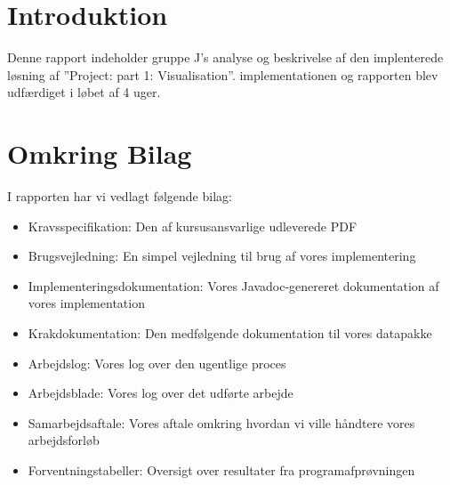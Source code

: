 \section{Introduktion}
Denne rapport indeholder gruppe J's analyse og beskrivelse af den implenterede løsning af ''Project: part 1: Visualisation''. implementationen og rapporten blev udfærdiget i løbet af 4 uger.
\section{Omkring Bilag}
I rapporten har vi vedlagt følgende bilag:
\begin{itemize}
\item{Kravsspecifikation: Den af kursusansvarlige udleverede PDF}
\item{Brugsvejledning: En simpel vejledning til brug af vores implementering}
\item{Implementeringsdokumentation: Vores Javadoc-genereret dokumentation af vores implementation}
\item{Krakdokumentation: Den medfølgende dokumentation til vores datapakke}
\item{Arbejdslog: Vores log over den ugentlige proces}
\item{Arbejdsblade: Vores log over det udførte arbejde}
\item{Samarbejdsaftale: Vores aftale omkring hvordan vi ville håndtere vores arbejdsforløb}
\item{Forventningstabeller: Oversigt over resultater fra programafprøvningen} 
\end{itemize}

